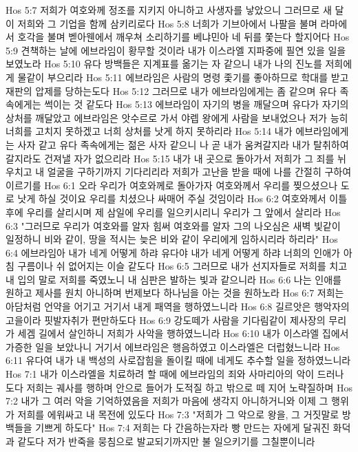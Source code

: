 Hos 5:7  저희가 여호와께 정조를 지키지 아니하고 사생자를 낳았으니 그러므로 새 달이 저희와 그 기업을 함께 삼키리로다
Hos 5:8  너희가 기브아에서 나팔을 불며 라마에서 호각을 불며 벧아웬에서 깨우쳐 소리하기를 베냐민아 네 뒤를 쫓는다 할지어다
Hos 5:9  견책하는 날에 에브라임이 황무할 것이라 내가 이스라엘 지파중에 필연 있을 일을 보였노라
Hos 5:10  유다 방백들은 지계표를 옮기는 자 같으니 내가 나의 진노를 저희에게 물같이 부으리라
Hos 5:11  에브라임은 사람의 명령 좇기를 좋아하므로 학대를 받고 재판의 압제를 당하는도다
Hos 5:12  그러므로 내가 에브라임에게는 좀 같으며 유다 족속에게는 썩이는 것 같도다
Hos 5:13  에브라임이 자기의 병을 깨달으며 유다가 자기의 상처를 깨달았고 에브라임은 앗수르로 가서 야렙 왕에게 사람을 보내었으나 저가 능히 너희를 고치지 못하겠고 너희 상처를 낫게 하지 못하리라
Hos 5:14  내가 에브라임에게는 사자 같고 유다 족속에게는 젊은 사자 같으니 나 곧 내가 움켜갈지라 내가 탈취하여 갈지라도 건져낼 자가 없으리라
Hos 5:15  내가 내 곳으로 돌아가서 저희가 그 죄를 뉘우치고 내 얼굴을 구하기까지 기다리리라 저희가 고난을 받을 때에 나를 간절히 구하여 이르기를
Hos 6:1  오라 우리가 여호와께로 돌아가자 여호와께서 우리를 찢으셨으나 도로 낫게 하실 것이요 우리를 치셨으나 싸매어 주실 것임이라
Hos 6:2  여호와께서 이틀 후에 우리를 살리시며 제 삼일에 우리를 일으키시리니 우리가 그 앞에서 살리라
Hos 6:3  "그러므로 우리가 여호와를 알자 힘써 여호와를 알자 그의 나오심은 새벽 빛같이 일정하니 비와 같이, 땅을 적시는 늦은 비와 같이 우리에게 임하시리라 하리라"
Hos 6:4  에브라임아 내가 네게 어떻게 하랴 유다야 내가 네게 어떻게 하랴 너희의 인애가 아침 구름이나 쉬 없어지는 이슬 같도다
Hos 6:5  그러므로 내가 선지자들로 저희를 치고 내 입의 말로 저희를 죽였노니 내 심판은 발하는 빛과 같으니라
Hos 6:6  나는 인애를 원하고 제사를 원치 아니하며 번제보다 하나님을 아는 것을 원하노라
Hos 6:7  저희는 아담처럼 언약을 어기고 거기서 내게 패역을 행하였느니라
Hos 6:8  길르앗은 행악자의 고을이라 핏발자취가 편만하도다
Hos 6:9  강도떼가 사람을 기다림같이 제사장의 무리가 세겜 길에서 살인하니 저희가 사악을 행하였느니라
Hos 6:10  내가 이스라엘 집에서 가증한 일을 보았나니 거기서 에브라임은 행음하였고 이스라엘은 더럽혔느니라
Hos 6:11  유다여 내가 내 백성의 사로잡힘을 돌이킬 때에 네게도 추수할 일을 정하였느니라
Hos 7:1  내가 이스라엘을 치료하려 할 때에 에브라임의 죄와 사마리아의 악이 드러나도다 저희는 궤사를 행하며 안으로 들어가 도적질 하고 밖으로 떼 지어 노략질하며
Hos 7:2  내가 그 여러 악을 기억하였음을 저희가 마음에 생각지 아니하거니와 이제 그 행위가 저희를 에워싸고 내 목전에 있도다
Hos 7:3  "저희가 그 악으로 왕을, 그 거짓말로 방백들을 기쁘게 하도다"
Hos 7:4  저희는 다 간음하는자라 빵 만드는 자에게 달궈진 화덕과 같도다 저가 반죽을 뭉침으로 발교되기까지만 불 일으키기를 그칠뿐이니라
